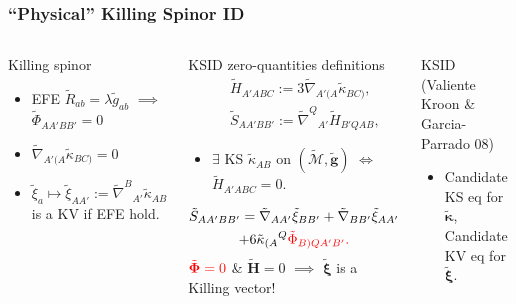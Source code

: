 \documentclass[10pt]{beamer}
\theoremstyle{plain}
\def\bmg{{\bm g}}
\def\bmH{{\bm H}}
\begin{document}
\begin{frame}
\frametitle{ ``Physical'' Killing Spinor ID}
\begin{columns}
\column{7.3cm}
\vspace{-5mm}
\begin{block}{Killing spinor}
  \begin{itemize}
  \item EFE $\tilde{R}_{ab}=\lambda\tilde{g}_{ab}$ $\implies$ $\tilde{\Phi}_{AA'BB'}=0$
  \item $ \tilde{\nabla}_{A'(A}\tilde{\kappa}_{BC)}=0$
  \item $\tilde{\xi}_{a} \mapsto \tilde{\xi}_{AA'}:= \tilde{\nabla}^{B}{}_{A'}\tilde{\kappa}_{AB}$
    is a KV if EFE hold.
  \end{itemize}
\end{block}
\pause
\begin{exampleblock}{KSID zero-quantities definitions}
\vspace{-5mm}
\begin{subequations}
\begin{eqnarray*}
&& \tilde{H}_{A'ABC} := 3
  \tilde{\nabla}_{A'(A}\tilde{\kappa}_{BC)}, \label{DefZeroQuantityH}\\ && \tilde{S}_{AA'BB'}
  :=
  \tilde{\nabla}^{Q}{}_{A'}\tilde{H}_{B'Q AB}, \label{DefZeroQuantityS}
\end{eqnarray*}
\end{subequations}
\vspace{-6mm}
\begin{itemize}
\item $\exists$ KS  $\tilde{\kappa}_{AB}$ on  $(\tilde{\mathcal{M}},\tilde{\bmg})$  $\iff$
  $\tilde{H}_{A'ABC}=0$.
\end{itemize}
\begin{multline*}\tilde{S}_{AA'BB'} = \tilde{\nabla}_{AA'}\tilde{\xi}_{BB'} +
  \tilde{\nabla}_{BB'}\tilde{\xi}_{AA'} \\ + 6\tilde{\kappa}_{(A}{}^{Q}\color{red}{\tilde{\Phi}}_{B)QA'B'}.
\end{multline*}
$\color{red}{\tilde{\bm\Phi}=0}$ \& $\tilde{\bmH}=0$ $\implies$ $\tilde{\bm\xi}$ is a Killing vector!
\end{exampleblock}
\column{4.3cm}
\vspace{-10mm}
\pause
\begin{block}{KSID (Valiente Kroon \& Garcia-Parrado 08) }
  \begin{itemize}
  \item Candidate KS eq for $\tilde{\bm\kappa}$, Candidate KV eq for $\tilde{\bm\xi}$.

\end{itemize}
\end{block}
\end{columns}
\end{frame}
\end{document}
